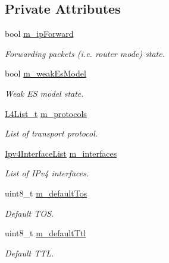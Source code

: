 \subsection*{Private Attributes}
\begin{DoxyCompactItemize}
\item 
bool \hyperlink{classns3_1_1Ipv4RouterL3Protocol_a912127799da7f6a52a5f4e467af543d4}{m\-\_\-ip\-Forward}
\begin{DoxyCompactList}\small\item\em Forwarding packets (i.\-e. router mode) state. \end{DoxyCompactList}\item 
bool \hyperlink{classns3_1_1Ipv4RouterL3Protocol_aa2364dafdd7d767041db38411457bd0c}{m\-\_\-weak\-Es\-Model}
\begin{DoxyCompactList}\small\item\em Weak E\-S model state. \end{DoxyCompactList}\item 
\hyperlink{classns3_1_1Ipv4RouterL3Protocol_adec096bbe99d3a07e5007ce510a9ca20}{L4\-List\-\_\-t} \hyperlink{classns3_1_1Ipv4RouterL3Protocol_ad714caec33f35a317af6fd596c6ff1f0}{m\-\_\-protocols}
\begin{DoxyCompactList}\small\item\em List of transport protocol. \end{DoxyCompactList}\item 
\hyperlink{classns3_1_1Ipv4RouterL3Protocol_a5756b4cefb3bc08242fcc25ce0694adb}{Ipv4\-Interface\-List} \hyperlink{classns3_1_1Ipv4RouterL3Protocol_a326e61efb33f76e57a147714e47b7e11}{m\-\_\-interfaces}
\begin{DoxyCompactList}\small\item\em List of I\-Pv4 interfaces. \end{DoxyCompactList}\item 
uint8\-\_\-t \hyperlink{classns3_1_1Ipv4RouterL3Protocol_a413b9a63b0966fb5ac97df317569a56f}{m\-\_\-default\-Tos}
\begin{DoxyCompactList}\small\item\em Default T\-O\-S. \end{DoxyCompactList}\item 
uint8\-\_\-t \hyperlink{classns3_1_1Ipv4RouterL3Protocol_adb12b01444eefa31adaf30ed6397cc52}{m\-\_\-default\-Ttl}
\begin{DoxyCompactList}\small\item\em Default T\-T\-L. \end{DoxyCompactList}\item 

\end{DoxyCompactItemize}
